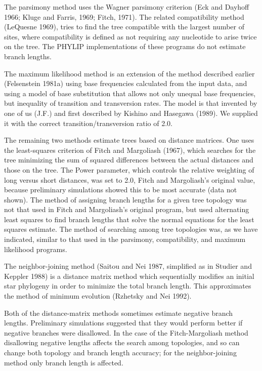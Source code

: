 	The parsimony method uses the Wagner parsimony criterion
(Eck and Dayhoff 1966; Kluge and Farris, 1969; Fitch, 1971).  The
related compatibility method (LeQuesne 1969), tries to find the tree
compatible with the largest number of sites, where compatibility is
defined as not requiring any nucleotide to arise twice on the tree.
The PHYLIP implementations of these programs do 
not estimate branch lengths. 

       The maximum likelihood method is an extension of the method
described earlier (Felsenstein 1981a) using base frequencies 
calculated from the input data, and using a model of base substitution
that allows not only unequal base frequencies, but inequality of transition
and transversion rates.  The model is that invented by one of us (J.F.) and
first described by Kishino and Hasegawa (1989).  We supplied it with the
correct transition/transversion ratio of 2.0.

	The remaining two methods estimate trees based on 
distance matrices.  One uses the least-squares criterion of Fitch 
and Margoliash (1967), which searches for the tree minimizing the 
sum of squared differences between the actual distances and those 
on the tree.  The Power parameter, which controls the relative 
weighting of long versus short distances, was set to 2.0, Fitch and 
Margoliash's original value, because preliminary simulations showed 
this to be most accurate (data not shown).  The method of assigning
branch lengths for a given tree topology was not that used in Fitch and
Margoliash's original program, but used alternating least squares to find
branch lengths that solve the normal equations for the least squares estimate.
The method of searching among tree topologies was, as we have indicated,
similar to that used in the parsimony, compatibility, and maximum likelihood
programs.

   The neighbor-joining method (Saitou and Nei 1987, simplified as in 
Studier and Keppler 1988) is a distance matrix method which
sequentially modifies an initial 
star phylogeny in order to minimize the total branch
length.  This approximates the method of minimum evolution (Rzhetsky and
Nei 1992).

	Both of the distance-matrix methods sometimes estimate 
negative branch lengths.  Preliminary simulations suggested that 
they would perform better if negative branches were disallowed.
In the case of the Fitch-Margoliash method
disallowing negative lengths affects the search among topologies, and so
can change both topology and branch length accuracy; for the neighbor-joining 
method only branch length is affected.

